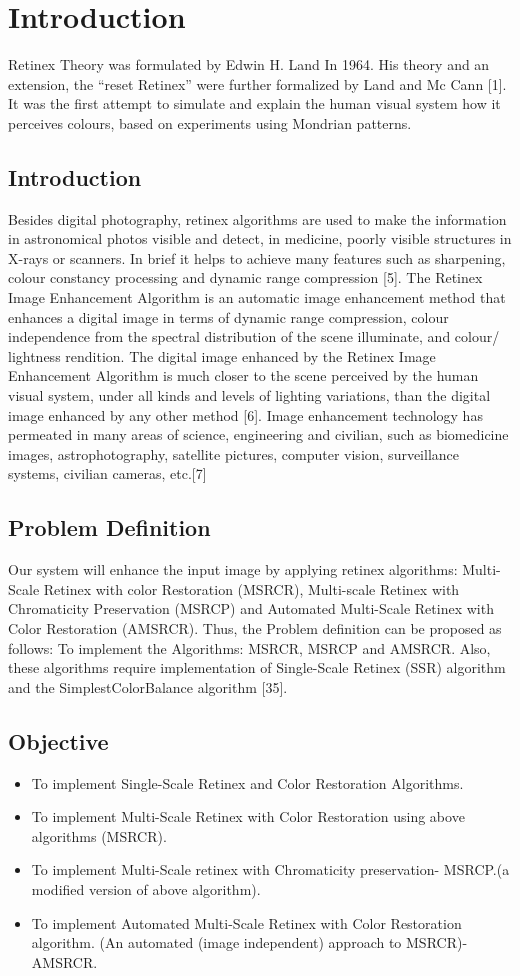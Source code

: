 \chapter{Introduction}
Retinex  Theory was formulated by Edwin H. Land In 1964. His theory and an extension, the “reset Retinex” were further formalized by Land and Mc Cann [1]. It was the first attempt to simulate and explain the human visual system how it perceives colours, based on experiments using Mondrian patterns.
\section{Introduction}
Besides digital photography, retinex algorithms are used to make the information in astronomical photos visible and detect, in medicine, poorly visible structures in X-rays or scanners. In brief it helps to achieve many features such as sharpening, colour constancy processing and dynamic range compression [5]. The Retinex Image Enhancement Algorithm is an automatic image enhancement method that enhances a digital image in terms of dynamic range compression, colour independence from the spectral distribution of the scene illuminate, and colour/ lightness rendition. The digital image enhanced by the Retinex Image Enhancement Algorithm is much closer to the scene perceived by the human visual system, under all kinds and levels of lighting variations, than the digital image enhanced by any other method [6]. Image enhancement technology has permeated in many areas of science, engineering and civilian, such as biomedicine images, astrophotography, satellite pictures, computer vision, surveillance systems, civilian cameras, etc.[7]

\section{Problem Definition}
Our system will enhance the input image by applying retinex algorithms: Multi-Scale Retinex with color Restoration (MSRCR), Multi-scale Retinex with Chromaticity Preservation (MSRCP) and Automated Multi-Scale Retinex with Color Restoration (AMSRCR). Thus, the Problem definition can be proposed as follows: To implement the Algorithms: MSRCR, MSRCP and AMSRCR. Also, these algorithms require implementation of Single-Scale Retinex (SSR) algorithm and the SimplestColorBalance algorithm [35].
\section{Objective}
	\begin{itemize}
		\item To implement Single-Scale Retinex and Color Restoration Algorithms.
		\item To implement Multi-Scale Retinex with Color Restoration using above 
		algorithms (MSRCR).
		\item To implement Multi-Scale retinex with Chromaticity preservation- MSRCP.(a 
		modified version of above algorithm).
		\item To implement Automated Multi-Scale Retinex with Color Restoration algorithm.	
		(An automated (image independent) approach to MSRCR)- AMSRCR.
	\end{itemize}
	
